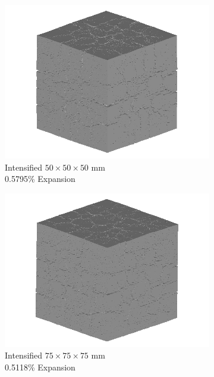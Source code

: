 \begin{figure}[ht!]
\centering
    \begin{subfigure}{.3\textwidth}
      \centering
      \includegraphics[width=.9\linewidth]{Files/exp_3D/DEF/A30X0C_3_3d.png}
    \caption{Intensified $50 \times 50 \times 50$ mm \\ 0.5795\% Expansion}
    \end{subfigure}%
    \begin{subfigure}{.3\textwidth}
      \centering
      \includegraphics[width=.9\linewidth]{Files/exp_3D/DEF/A30X-5C_3_3d.png}
    \caption{Intensified $75 \times 75 \times 75$ mm \\  0.5118\% Expansion}
    \end{subfigure}
    \begin{subfigure}{.3\textwidth}
      \centering

\end{subfigure}
\end{figure}
